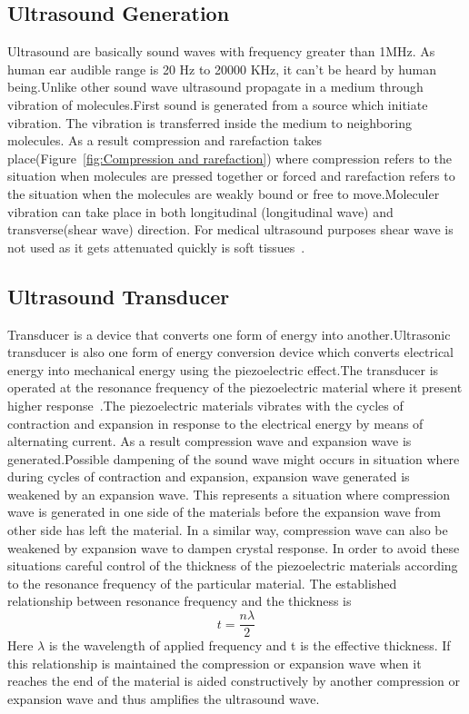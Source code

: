 \subsection{Ultrasound Generation}
Ultrasound are basically sound waves with frequency greater than 1MHz. As human ear audible range is 20 Hz to 20000 KHz, it can't be heard by human being.Unlike other sound wave ultrasound propagate in a medium through vibration of molecules.First sound is generated from a source which initiate vibration. The vibration is transferred inside the medium to neighboring molecules. As a result compression and rarefaction takes place(Figure~\ref{fig:Compression and rarefaction}) where compression refers to the situation when molecules are pressed together or forced and rarefaction refers to the situation when the molecules are weakly bound or free to move.Moleculer vibration can take place in both longitudinal (longitudinal wave) and transverse(shear wave) direction. For medical ultrasound purposes shear wave is not used as it gets attenuated quickly is soft tissues~\cite{Hynynen...5,Carson.1978.JCU.126,Hunt.1987..354,Hynynen.1990..61}.




\subsection{Ultrasound Transducer}
Transducer is a device that converts one form of energy into another.Ultrasonic transducer is also one form of energy conversion device which converts electrical energy into mechanical energy using the piezoelectric effect.The transducer is operated at the resonance frequency of the piezoelectric material where it present higher response~\cite{Takasaki.2007..3817}.The piezoelectric materials vibrates with the cycles of contraction and expansion in response to the electrical energy by means of alternating current. As a result compression wave and expansion wave is generated.Possible dampening of the sound wave might occurs in situation where during cycles of contraction and expansion, expansion wave generated is weakened by an expansion wave. This represents a situation where compression wave is generated in one side of the materials before the expansion wave from other side has left the material. In a similar way, compression wave can also be weakened by expansion wave to dampen crystal response. In order to avoid these situations  careful control of the thickness of the piezoelectric materials according to the resonance frequency of the particular material. The established relationship between resonance frequency  and the thickness is
 \begin{equation}\label{Eq:Phase-parallel}
    t=\frac{n\lambda}{2}
\end{equation}
Here $\lambda$ is the wavelength of applied frequency and t is the effective thickness.
If this relationship is maintained the compression or expansion wave when it reaches the end of the material is aided constructively by another compression or expansion wave and thus amplifies the ultrasound wave.

